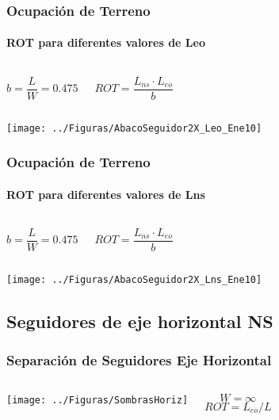 \documentclass[serif, xcolor=dvipsnames]{beamer}
\begin{document}
\begin{frame}[plain]
\frametitle{Ocupación de Terreno}


\framesubtitle{ROT para diferentes valores de Leo}
\begin{columns}[t]%


\column{4cm}

{\footnotesize \[
b=\frac{L}{W}=0.475\]
}{\footnotesize \par}


\column{4cm}

{\footnotesize \[
ROT=\frac{L_{ns}\cdot L_{eo}}{b}\]
}{\footnotesize \par}

\end{columns}%
\begin{center}
\texttt{[image: ../Figuras/AbacoSeguidor2X\_Leo\_Ene10]}
\par\end{center}


\end{frame}

\begin{frame}[plain]
\frametitle{Ocupación de Terreno}


\framesubtitle{ROT para diferentes valores de Lns}
\begin{columns}[t]%


\column{4cm}

{\footnotesize \[
b=\frac{L}{W}=0.475\]
}{\footnotesize \par}


\column{4cm}

{\footnotesize \[
ROT=\frac{L_{ns}\cdot L_{eo}}{b}\]
}{\footnotesize \par}

\end{columns}%
\begin{center}
\texttt{[image: ../Figuras/AbacoSeguidor2X\_Lns\_Ene10]}
\par\end{center}


\end{frame}

\subsection{Seguidores de eje horizontal NS}


\begin{frame}
\frametitle{Separación de Seguidores Eje Horizontal}
\begin{columns}%


\column{5cm}

\begin{center}
\texttt{[image: ../Figuras/SombrasHoriz]}
\par\end{center}


\column{3cm}

\[
W=\infty\]
\[
ROT=L_{eo}/L\]


\end{columns}%

\end{frame}
\end{document}
